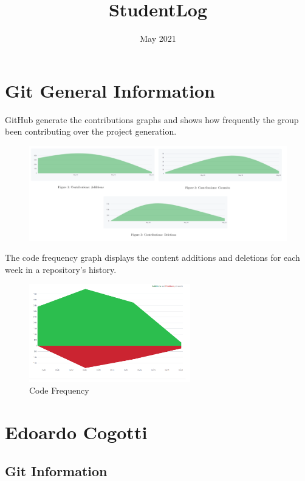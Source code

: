 \documentclass{article}
\title{StudentLog}
\date{May 2021}
\begin{document}
\maketitle

\section{Git General Information}

GitHub generate the contributions graphs and shows how frequently the group been contributing over the project generation.

\begin{figure}[h!]
\centering
\includegraphics[width=13cm]{img/group.PNG}
\label{fig:group}
\end{figure}


The code frequency graph displays the content additions and deletions for each week in a repository's history.

\begin{figure}[h!]
\centering
\includegraphics[width=7cm]{img/Code-frequency.PNG}
\caption{Code Frequency}
\label{fig:frequency}
\end{figure}


\section{Edoardo Cogotti}

\subsection{Git Information}
\end{document}
